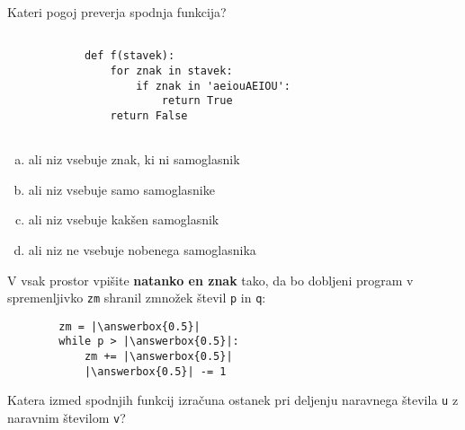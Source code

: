 \documentclass[arhiv, 10pt]{../izpit}
\newcommand{\inlinepy}[1]{\texttt{#1}}
\newcommand{\answerbox}[1]{\framebox{\vphantom{\large M}\hspace{#1cm}}}
\begin{document}
        \naloga*

        \begin{multicols}{2}
        \noindent
        Kateri pogoj preverja spodnja funkcija?
        \begin{verbatim}
        
            def f(stavek):
                for znak in stavek:
                    if znak in 'aeiouAEIOU':
                        return True
                return False
            
        \end{verbatim}

        \begin{enumerate}[(a)]
\item ali niz vsebuje znak, ki ni samoglasnik
\item ali niz vsebuje samo samoglasnike
\item ali niz vsebuje kakšen samoglasnik
\item ali niz ne vsebuje nobenega samoglasnika
\end{enumerate}

        \end{multicols}
    
        \naloga*
        \begin{multicols}{2}
        \noindent
        V vsak prostor vpišite \textbf{natanko en znak} tako, da bo dobljeni program v spremenljivko \inlinepy{zm} shranil zmnožek števil \inlinepy{p} in \inlinepy{q}:
        
        \columnbreak
        \begin{verbatim}
        zm = |\answerbox{0.5}|
        while p > |\answerbox{0.5}|:
            zm += |\answerbox{0.5}|
            |\answerbox{0.5}| -= 1
        \end{verbatim}
        \end{multicols}
    
        \clearpage
        \naloga
        
        Katera izmed spodnjih funkcij izračuna ostanek pri deljenju naravnega števila \inlinepy{u} z naravnim številom \inlinepy{v}?
    
\end{document}
